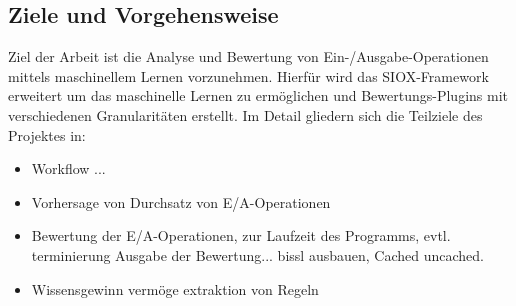 \subsection{Ziele und Vorgehensweise}





Ziel der Arbeit ist die Analyse und Bewertung von Ein-/Ausgabe-Operationen mittels maschinellem Lernen vorzunehmen.
Hierfür wird das SIOX-Framework erweitert um das maschinelle Lernen zu ermöglichen und Bewertungs-Plugins mit verschiedenen Granularitäten erstellt.
Im Detail gliedern sich die Teilziele des Projektes in:
\begin{itemize}
\item Workflow ...
\item Vorhersage von Durchsatz von E/A-Operationen
\item Bewertung der E/A-Operationen, zur Laufzeit des Programms, evtl. terminierung Ausgabe der Bewertung... bissl ausbauen, Cached uncached.
\item Wissensgewinn vermöge extraktion von Regeln 
\end{itemize}

